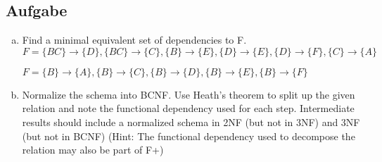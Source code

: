 \documentclass[11pt,a4paper,DIV=9]{scrartcl}
\newcounter{temp}
\newcommand{\aufgabe}[1]{
  \setcounter{temp}{\value{subsection}}
  \setcounter{subsection}{#1}
  \addtocounter{subsection}{-1}
  \subsection{Aufgabe}
  \setcounter{subsection}{\value{temp}}
}
\begin{document}
\aufgabe{4}
  \begin{enumerate}[a.]
    \item Find a minimal equivalent set of dependencies to F. \\
    $ F = \{{BC\} \rightarrow \{D}\}, \{{BC\} \rightarrow \{C}\}, \{{B\} \rightarrow \{E}\}, \{{D\} \rightarrow \{E}\}, \{{D\} \rightarrow \{F}\}, \{{C\} \rightarrow \{A}\} $
    
        $ F = \{{B\} \rightarrow \{A}\}, \{{B\} \rightarrow \{C}\}, \{{B\} \rightarrow \{D}\}, \{{B\} \rightarrow \{E}\}, \{{B\} \rightarrow \{F}\} $
    \item Normalize the schema into BCNF. Use Heath's theorem to split up the given relation and note the functional dependency used for each step. Intermediate results should include a normalized schema in 2NF (but not in 3NF) and 3NF (but not in BCNF) (Hint: The functional dependency used to decompose the relation may also be part of F+)
  \end{enumerate}
\end{document}
